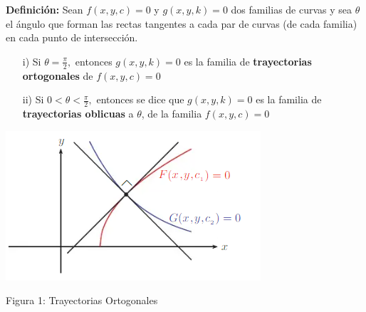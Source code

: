 \documentclass[12pt,letterpaper]{article}
\begin{document}
\begin{titlepage}
\begin{flushleft}
\textbf{Definición:} Sean $f(x,y,c) = 0$ y $g (x,y,k) = 0$ dos familias de curvas y sea $\theta$ el ángulo que forman las rectas tangentes a cada par de curvas (de cada familia) en cada punto de intersección.
\begin{itemize}
\item[i)] Si $\theta = \frac{\pi}{2},$ entonces $g(x,y,k) = 0$ es la familia de \textbf{trayectorias ortogonales} de $f(x,y,c) = 0$ 

\item[ii)] Si $ 0 < \theta < \frac{\pi}{2},$ entonces se dice que $g(x,y,k) = 0$ es la familia de \textbf{trayectorias oblicuas} a $\theta$, de la familia $f(x,y,c) = 0$ 

\end{itemize}
\begin{center}

\includegraphics[scale=1]{Figura Trayec Ortogona}

Figura 1: Trayectorias Ortogonales
\end{center}
\end{flushleft}

\end{titlepage}
\end{document}
